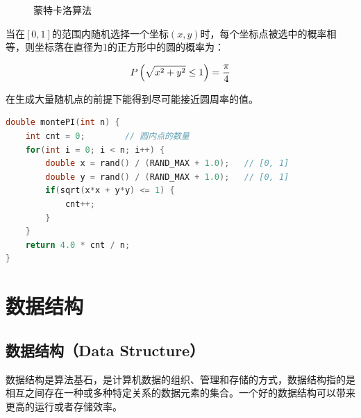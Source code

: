 \begin{figure}[H]
	\centering
	\caption{蒙特卡洛算法}
\end{figure}

当在$ [0, 1] $的范围内随机选择一个坐标$ (x, y) $时，每个坐标点被选中的概率相等，则坐标落在直径为1的正方形中的圆的概率为：

$$
	P \left( \sqrt{x^2 + y^2} \le 1 \right) = {\pi \over 4}
$$

在生成大量随机点的前提下能得到尽可能接近圆周率的值。\\


\begin{lstlisting}[language=C]
double montePI(int n) {
	int cnt = 0;        // 圆内点的数量
	for(int i = 0; i < n; i++) {
		double x = rand() / (RAND_MAX + 1.0);   // [0, 1]
		double y = rand() / (RAND_MAX + 1.0);   // [0, 1]
		if(sqrt(x*x + y*y) <= 1) {
			cnt++;
		}
	}
	return 4.0 * cnt / n;
}
\end{lstlisting}

\newpage

\section{数据结构}

\subsection{数据结构（Data Structure）}

数据结构是算法基石，是计算机数据的组织、管理和存储的方式，数据结构指的是相互之间存在一种或多种特定关系的数据元素的集合。一个好的数据结构可以带来更高的运行或者存储效率。\\

